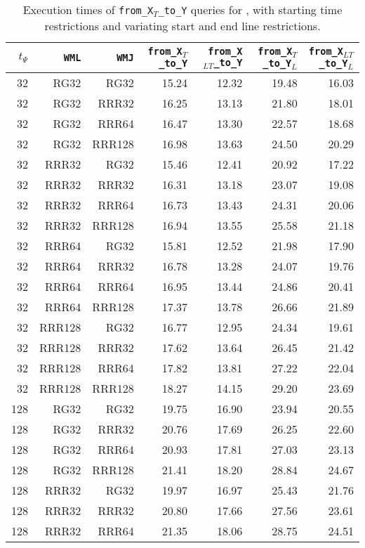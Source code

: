 \begin{table}
\caption{Execution times of \texttt{from\_X$_T$\_to\_Y} queries for \ctr, with starting time restrictions and variating start and end line restrictions.}
\begin{tabular}{|r|r|r|r|r|r|r|}
\hline
$t_{\Psi}$ & \texttt{WML} & \texttt{WMJ} & \texttt{from\_X$_{T}$\_to\_Y} & \texttt{from\_X$_{LT}$\_to\_Y} & \texttt{from\_X$_{T}$\_to\_Y$_{L}$} & \texttt{from\_X$_{LT}$\_to\_Y$_{L}$} \\
\hline
32 & RG32 & RG32 & 15.24 & 12.32 & 19.48 & 16.03 \\
32 & RG32 & RRR32 & 16.25 & 13.13 & 21.80 & 18.01 \\
32 & RG32 & RRR64 & 16.47 & 13.30 & 22.57 & 18.68 \\
32 & RG32 & RRR128 & 16.98 & 13.63 & 24.50 & 20.29 \\
32 & RRR32 & RG32 & 15.46 & 12.41 & 20.92 & 17.22 \\
32 & RRR32 & RRR32 & 16.31 & 13.18 & 23.07 & 19.08 \\
32 & RRR32 & RRR64 & 16.73 & 13.43 & 24.31 & 20.06 \\
32 & RRR32 & RRR128 & 16.94 & 13.55 & 25.58 & 21.18 \\
32 & RRR64 & RG32 & 15.81 & 12.52 & 21.98 & 17.90 \\
32 & RRR64 & RRR32 & 16.78 & 13.28 & 24.07 & 19.76 \\
32 & RRR64 & RRR64 & 16.95 & 13.44 & 24.86 & 20.41 \\
32 & RRR64 & RRR128 & 17.37 & 13.78 & 26.66 & 21.89 \\
32 & RRR128 & RG32 & 16.77 & 12.95 & 24.34 & 19.61 \\
32 & RRR128 & RRR32 & 17.62 & 13.64 & 26.45 & 21.42 \\
32 & RRR128 & RRR64 & 17.82 & 13.81 & 27.22 & 22.04 \\
32 & RRR128 & RRR128 & 18.27 & 14.15 & 29.20 & 23.69 \\
128 & RG32 & RG32 & 19.75 & 16.90 & 23.94 & 20.55 \\
128 & RG32 & RRR32 & 20.76 & 17.69 & 26.25 & 22.60 \\
128 & RG32 & RRR64 & 20.93 & 17.81 & 27.03 & 23.13 \\
128 & RG32 & RRR128 & 21.41 & 18.20 & 28.84 & 24.67 \\
128 & RRR32 & RG32 & 19.97 & 16.97 & 25.43 & 21.76 \\
128 & RRR32 & RRR32 & 20.80 & 17.66 & 27.56 & 23.61 \\
128 & RRR32 & RRR64 & 21.35 & 18.06 & 28.75 & 24.51 \\

\end{tabular}
\end{table}
